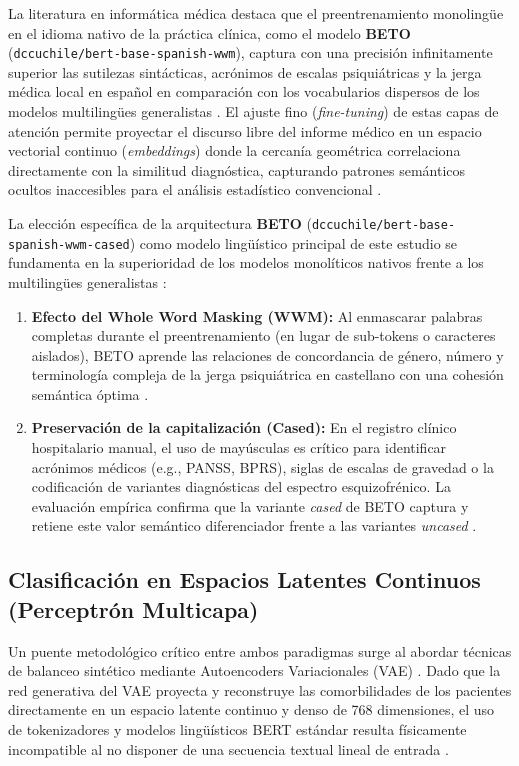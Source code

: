 \documentclass[12pt,a4paper,onecolumn,oneside]{report}
\begin{document}
La literatura en informática médica destaca que el preentrenamiento monolingüe en el idioma nativo de la práctica clínica, como el modelo \textbf{BETO} (\texttt{dccuchile/bert-base-spanish-wwm}), captura con una precisión infinitamente superior las sutilezas sintácticas, acrónimos de escalas psiquiátricas y la jerga médica local en español en comparación con los vocabularios dispersos de los modelos multilingües generalistas \cite{canete2020beto, vidal2023algoritmo}. El ajuste fino (\textit{fine-tuning}) de estas capas de atención permite proyectar el discurso libre del informe médico en un espacio vectorial continuo (\textit{embeddings}) donde la cercanía geométrica correlaciona directamente con la similitud diagnóstica, capturando patrones semánticos ocultos inaccesibles para el análisis estadístico convencional \cite{vidal2023algoritmo}.

La elección específica de la arquitectura \textbf{BETO} (\texttt{dccuchile/bert-base-spanish-wwm-cased}) como modelo lingüístico principal de este estudio se fundamenta en la superioridad de los modelos monolíticos nativos frente a los multilingües generalistas \cite{canete2020beto, vidal2023algoritmo}:
\begin{enumerate}
    \item \textbf{Efecto del Whole Word Masking (WWM):} Al enmascarar palabras completas durante el preentrenamiento (en lugar de sub-tokens o caracteres aislados), BETO aprende las relaciones de concordancia de género, número y terminología compleja de la jerga psiquiátrica en castellano con una cohesión semántica óptima \cite{canete2020beto}.
    \item \textbf{Preservación de la capitalización (Cased):} En el registro clínico hospitalario manual, el uso de mayúsculas es crítico para identificar acrónimos médicos (e.g., PANSS, BPRS), siglas de escalas de gravedad o la codificación de variantes diagnósticas del espectro esquizofrénico. La evaluación empírica confirma que la variante \textit{cased} de BETO captura y retiene este valor semántico diferenciador frente a las variantes \textit{uncased} \cite{vidal2023algoritmo}.
\end{enumerate}


\subsection{Clasificación en Espacios Latentes Continuos (Perceptrón Multicapa)}
Un puente metodológico crítico entre ambos paradigmas surge al abordar técnicas de balanceo sintético mediante Autoencoders Variacionales (VAE) \cite{saboori2025predictive}. Dado que la red generativa del VAE proyecta y reconstruye las comorbilidades de los pacientes directamente en un espacio latente continuo y denso de 768 dimensiones, el uso de tokenizadores y modelos lingüísticos BERT estándar resulta físicamente incompatible al no disponer de una secuencia textual lineal de entrada \cite{saboori2025predictive, canete2020beto}. 
\end{document}
